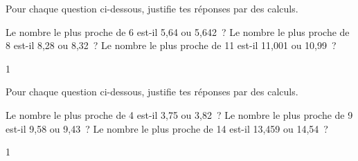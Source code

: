 \documentclass[a4paper,11pt]{report}
\begin{document}
\begin{exo}{
Pour chaque question ci-dessous, justifie tes réponses par des calculs.
\begin{tasks}[after-item-skip = 0.2em, after-skip=-0.5em,before-skip=-0.5em]

\task Le nombre le plus proche de 6 est-il 5,64 ou 5,642~?
\task Le nombre le plus proche de 8 est-il 8,28 ou 8,32~?
\task Le nombre le plus proche de 11 est-il 11,001 ou 10,99~?
\end{tasks}
}{1}\end{exo}


\begin{exo}{
Pour chaque question ci-dessous, justifie tes réponses par des calculs.
\begin{tasks}[after-item-skip = 0.2em, after-skip=-0.5em, before-skip=-0.5em]

\task Le nombre le plus proche de 4 est-il 3,75 ou 3,82~?
\task Le nombre le plus proche de 9 est-il 9,58 ou 9,43~?
\task Le nombre le plus proche de 14 est-il 13,459 ou 14,54~?
\end{tasks}
}{1}\end{exo}
\end{document}
